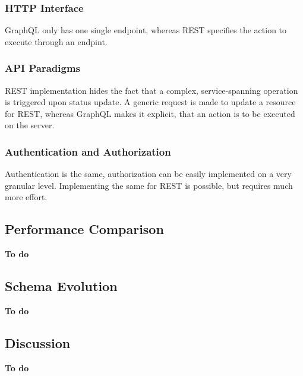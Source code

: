 \subsubsection{\acs{HTTP} Interface}

GraphQL only has one single endpoint, whereas REST specifies the action to execute through an endpint.

\subsubsection{\acs{API} Paradigms}

REST implementation hides the fact that a complex, service-spanning operation is triggered upon status update.
A generic request is made to update a resource for REST, whereas GraphQL makes it explicit, that an action is to be executed on the server.

\subsubsection{Authentication and Authorization}

Authentication is the same, authorization can be easily implemented on a very granular level.
Implementing the same for REST is possible, but requires much more effort.

\subsection{Performance Comparison}

\textbf{To do}

\subsection{Schema Evolution}

\textbf{To do}

\subsection{Discussion}

\textbf{To do}